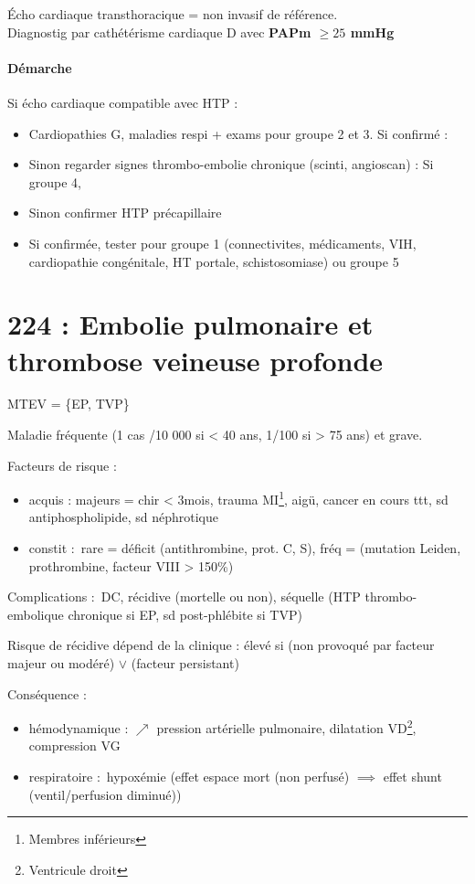 \documentclass{article}
\begin{document}
Écho cardiaque transthoracique = non invasif de référence. \\
Diagnostig par cathétérisme cardiaque D avec \textbf{PAPm $\ge 25$ mmHg}

\paragraph{Démarche}
Si écho cardiaque compatible avec HTP :
\begin{itemize}
\item Cardiopathies G, maladies respi + exams pour groupe 2 et 3. Si confirmé
  : \faHandStopO
\item Sinon regarder signes thrombo-embolie chronique (scinti, angioscan) : Si
  groupe 4, \faHandStopO
\item Sinon confirmer HTP précapillaire 
\item Si confirmée, tester pour groupe 1 (connectivites, médicaments, VIH,
  cardiopathie congénitale, HT portale, schistosomiase) ou groupe 5
\end{itemize}



\section{224 : Embolie pulmonaire et thrombose veineuse profonde}%
\label{sec:224_embolie_pulmonaire_et_thrombose_veineuse_profonde}
\gls{MTEV} = \{\gls{EP}, \gls{TVP}\}

Maladie fréquente (1 cas /10 000 si < 40 ans, 1/100 si > 75 ans) et grave.

Facteurs de risque :
\begin{itemize}
\item acquis : majeurs = chir < 3mois, trauma MI\footnote{Membres inférieurs},
  \faHospitalO{} aigü, cancer en cours  ttt, sd antiphospholipide, sd
  néphrotique
\item constit : rare = déficit (antithrombine, prot. C, S), fréq = (mutation {Leiden,
    prothrombine}, facteur VIII > 150\%)
\end{itemize}
Complications : DC, récidive (mortelle ou non), séquelle (HTP thrombo-embolique
chronique si EP, sd post-phlébite si TVP)

Risque de récidive dépend de la clinique : élevé si (non provoqué par facteur
majeur ou modéré) $\vee$ (\og facteur persistant)

Conséquence :
\begin{itemize}
\item hémodynamique : $\nearrow$ pression artérielle pulmonaire, dilatation
  VD\footnote{Ventricule droit}, compression VG
\item respiratoire : hypoxémie (effet espace mort (non perfusé) $\implies$ effet shunt
  (ventil/perfusion diminué))
\end{itemize}
\end{document}
